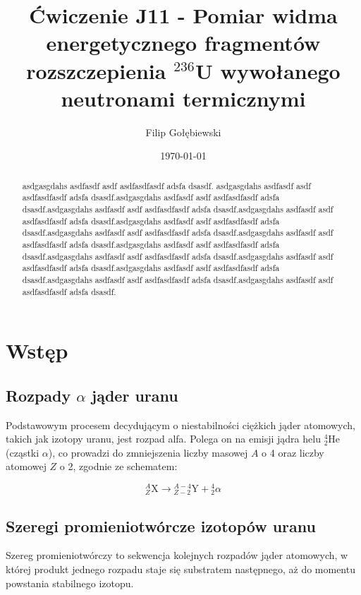 \documentclass[a4paper,12pt]{article}
\title{{Ćwiczenie J11 - Pomiar widma energetycznego
fragmentów rozszczepienia $^{236}$U wywołanego
neutronami termicznymi}}
\author{Filip Gołębiewski}
\date{\today}
\begin{document}
\maketitle

\begin{abstract}
asdgasgdahs asdfasdf asdf asdfasdfasdf adsfa dsasdf. asdgasgdahs asdfasdf asdf asdfasdfasdf adsfa dsasdf.asdgasgdahs asdfasdf asdf asdfasdfasdf adsfa dsasdf.asdgasgdahs asdfasdf asdf asdfasdfasdf adsfa dsasdf.asdgasgdahs asdfasdf asdf asdfasdfasdf adsfa dsasdf.asdgasgdahs asdfasdf asdf asdfasdfasdf adsfa dsasdf.asdgasgdahs asdfasdf asdf asdfasdfasdf adsfa dsasdf.asdgasgdahs asdfasdf asdf asdfasdfasdf adsfa dsasdf.asdgasgdahs asdfasdf asdf asdfasdfasdf adsfa dsasdf.asdgasgdahs asdfasdf asdf asdfasdfasdf adsfa dsasdf.asdgasgdahs asdfasdf asdf asdfasdfasdf adsfa dsasdf.asdgasgdahs asdfasdf asdf asdfasdfasdf adsfa dsasdf.asdgasgdahs asdfasdf asdf asdfasdfasdf adsfa dsasdf.asdgasgdahs asdfasdf asdf asdfasdfasdf adsfa dsasdf.
\end{abstract}

\section{Wstęp}

\subsection{Rozpady \texorpdfstring{$\alpha$}{alfa} jąder uranu}

Podstawowym procesem decydującym o niestabilności ciężkich jąder atomowych, takich jak izotopy uranu, jest rozpad alfa. Polega on na emisji jądra helu ${}^{4}_{2}\text{He}$ (cząstki $\alpha$), co prowadzi do zmniejszenia liczby masowej $A$ o 4 oraz liczby atomowej $Z$ o 2, zgodnie ze schematem:

\begin{equation}
{}^{A}_{Z}\text{X} \rightarrow {}^{A-4}_{Z-2}\text{Y} + {}^{4}_{2}\alpha
\end{equation}

\subsection{Szeregi promieniotwórcze izotopów uranu}

Szereg promieniotwórczy to sekwencja kolejnych rozpadów jąder atomowych, w której produkt jednego rozpadu staje się substratem następnego, aż do momentu powstania stabilnego izotopu.
\end{document}
